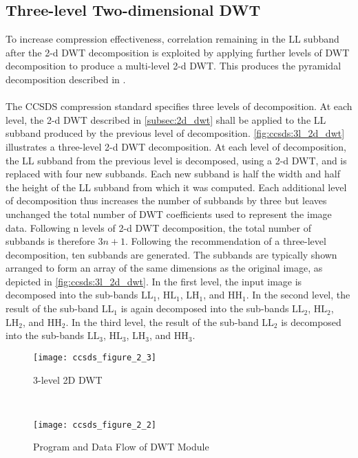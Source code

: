 \subsection{Three-level Two-dimensional DWT}
To increase compression effectiveness, correlation remaining in the LL subband after the 2-d DWT decomposition is exploited by applying further levels of DWT decomposition to produce a multi-level 2-d DWT. This produces the pyramidal decomposition described in \cite{Mallat1989}. \\\\
The \gls{CCSDS} compression standard\cite{CCSDS122green} specifies three levels of decomposition. At each level, the 2-d DWT described in \autoref{subsec:2d_dwt} shall be applied to the LL subband produced by the previous level of decomposition. \autoref{fig:ccsds:3l_2d_dwt} illustrates a three-level 2-d DWT decomposition. At each level of decomposition, the LL subband from the previous level is decomposed, using a 2-d DWT, and is replaced with four new subbands. Each new subband is half the width and half the height of the LL subband from which it was computed. Each additional level of decomposition thus increases the number of subbands by three but leaves unchanged the total number of DWT coefficients used to represent the image data. Following n levels of 2-d DWT decomposition, the total number of subbands is therefore $3n+1$. Following the recommendation of a three-level decomposition, ten subbands are generated. The subbands are typically shown arranged to form an array of the same dimensions as the original image, as depicted in \autoref{fig:ccsds:3l_2d_dwt}. In the first level, the input image is decomposed into the sub-bands $\mathrm{LL}_1$, $\mathrm{HL}_1$, $\mathrm{LH}_1$, and $\mathrm{HH}_1$. In the second level, the result of the sub-band $\mathrm{LL}_1$ is again decomposed into the sub-bands $\mathrm{LL}_2$, $\mathrm{HL}_2$, $\mathrm{LH}_2$, and $\mathrm{HH}_2$. In the third level, the result of the sub-band $\mathrm{LL}_2$ is decomposed into the sub-bands $\mathrm{LL}_3$, $\mathrm{HL}_3$, $\mathrm{LH}_3$, and $\mathrm{HH}_3$. 
\begin{figure}[tb]
  \centering
  \texttt{[image: ccsds\_figure\_2\_3]}
  \caption{3-level 2D DWT\cite{CCSDS122blue}}
  \label{fig:ccsds:3l_2d_dwt}
\end{figure}
\\
\begin{figure}[tb]
  \centering
  \texttt{[image: ccsds\_figure\_2\_2]}
  \caption{Program and Data Flow of DWT Module\cite{CCSDS122green}}
  \label{fig:ccsds:dwt_stages}
\end{figure}

